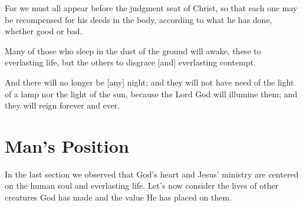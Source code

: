 \vspace{2\baselineskip}


\begin{scripture}[2 Corinthians 5:10]
         For we must all appear before the judgment seat of Christ, so that each one 
        may be recompensed for his deeds in the body, according to what he has done, whether 
        good or bad.
\end{scripture}

\vspace{2\baselineskip}

\begin{scripture}[Daniel 12:2]
         Many of those who sleep in the dust of the ground will awake, these to everlasting 
        life, but the others to disgrace [and] everlasting contempt.
\end{scripture}

\vspace{2\baselineskip}

\begin{scripture}[Revelation 22:5]
         And there will no longer be [any] night; and they will not have need of the light 
        of a lamp nor the light of the sun, because the Lord God will illumine them; and they will 
        reign forever and ever.
\end{scripture}

\vspace{2\baselineskip}

\newpage
\section{Man's Position}
In the last section we observed that God's heart and Jesus' ministry are 
centered on the human soul and everlasting life. Let's now consider the lives 
of other creatures God has made and the value He has placed on them.

\vspace{2\baselineskip}


